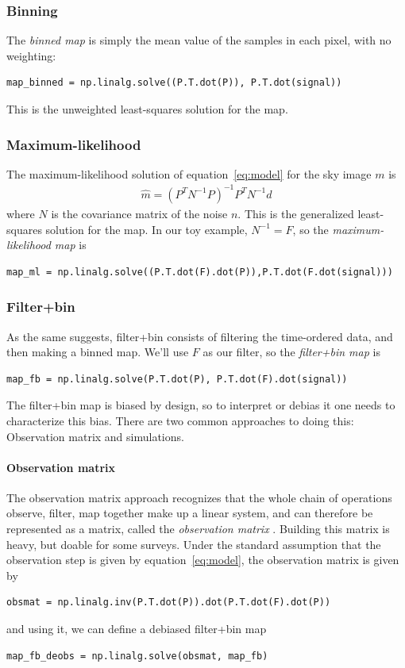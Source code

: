 \documentclass[twocolumn,apj]{aastex63}
\begin{document}
\subsubsection{Binning}
The \emph{binned map} is simply the mean value of the samples
in each pixel, with no weighting:
\begin{lstlisting}
map_binned = np.linalg.solve((P.T.dot(P)), P.T.dot(signal))
\end{lstlisting}
This is the unweighted least-squares solution for the map.

\subsubsection{Maximum-likelihood}
The maximum-likelihood solution of equation~\ref{eq:model} for the
sky image $m$ is
\begin{align}
	\hat m = (P^TN^{-1}P)^{-1}P^TN^{-1}d
\end{align}
where $N$ is the covariance matrix of the noise $n$. This is the
generalized least-squares solution for the map.
In our toy example, $N^{-1} = F$, so the \emph{maximum-likelihood map}
is
\begin{lstlisting}
map_ml = np.linalg.solve((P.T.dot(F).dot(P)),P.T.dot(F.dot(signal)))
\end{lstlisting}

\subsubsection{Filter+bin}
As the same suggests, filter+bin consists of filtering the time-ordered
data, and then making a binned map. We'll use $F$ as our filter, so
the \emph{filter+bin map} is
\begin{lstlisting}
map_fb = np.linalg.solve(P.T.dot(P), P.T.dot(F).dot(signal))
\end{lstlisting}
The filter+bin map is biased by design, so to interpret or debias it one
needs to characterize this bias. There are two common approaches
to doing this: Observation matrix and simulations.

\paragraph{Observation matrix}
The observation matrix approach
recognizes that the whole chain of operations observe, filter, map
together make up a linear system, and can therefore be represented
as a matrix, called the \emph{observation matrix} \citep{bicep2-obsmat}.
Building this matrix is heavy, but doable for some
surveys. Under the standard assumption that the observation step is
given by equation~\ref{eq:model}, the observation matrix is given by
\begin{lstlisting}
obsmat = np.linalg.inv(P.T.dot(P)).dot(P.T.dot(F).dot(P))
\end{lstlisting}
and using it, we can define a debiased filter+bin map
\begin{lstlisting}
map_fb_deobs = np.linalg.solve(obsmat, map_fb)
\end{lstlisting}
\end{document}
